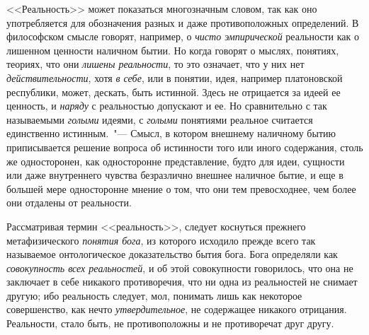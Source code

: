 <<Реальность>> может показаться многозначным словом,
так как оно употребляется для обозначения разных
и даже противоположных определений. В философском
смысле говорят, например, о \emph{чисто эмпирической} реальности
как о лишенном ценности наличном бытии. Но
когда говорят о мыслях, понятиях, теориях, что они \emph{лишены
реальности}, то это означает, что у них нет \emph{действительности},
хотя \emph{в себе}, или в понятии, идея, например
платоновской республики, может, дескать, быть истинной.
Здесь не отрицается за идеей ее ценность, и \emph{наряду}
с реальностью допускают и ее. Но сравнительно с так называемыми
\emph{голыми} идеями, с \emph{голыми} понятиями реальное
считается единственно истинным.~"--- Смысл, в котором
внешнему наличному бытию приписывается решение
вопроса об истинности того или иного содержания,
столь же односторонен, как односторонне представление,
будто для идеи, сущности или даже внутреннего чувства
безразлично внешнее наличное бытие, и еще в большей
мере односторонне мнение о том, что они тем превосходнее,
чем более они отдалены от реальности.

Рассматривая термин <<реальность>>, следует коснуться
прежнего метафизического \emph{понятия бога}, из которого
исходило прежде всего так называемое онтологическое
доказательство бытия бога. Бога определяли как \emph{совокупность
всех реальностей}, и об этой совокупности говорилось,
что она не заключает в себе никакого противоречия,
что ни одна из реальностей не снимает другую; ибо
реальность следует, мол, понимать лишь как некоторое
совершенство, как нечто \emph{утвердительное}, не содержащее
никакого отрицания. Реальности, стало быть, не противоположны
и не противоречат друг другу.

